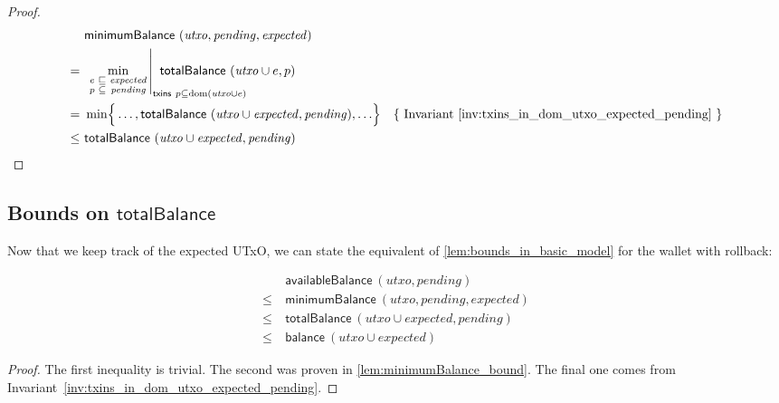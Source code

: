 \documentclass{article}
\DeclareMathOperator{\dom}{dom}
\DeclareMathOperator*{\minimum}{min}
\theoremstyle{definition}{
  \newtheorem{lemma}{Lemma}[section] %
  \newtheorem{definition}[lemma]{Definition}
}
\theoremstyle{theorem}{
  \newtheorem{invariant}[lemma]{Invariant}
  \newtheorem{proofobligation}[lemma]{Proof Obligation}
}
\numberwithin{equation}{lemma}
\begin{document}
\begin{proof}
\begin{align*}
    & ~ \mathsf{minimumBalance} ~ (\mathit{utxo}, \mathit{pending}, \mathit{expected}) \\
=   & ~ \left.
        \minimum_{\begin{smallmatrix}
                    e & \sqsubseteq & \mathit{expected} \\
                    p & \subseteq   & \mathit{pending}
                  \end{smallmatrix}}
        \right|_{\mathrlap{\mathsf{txins} ~ p \subseteq \dom(\mathit{utxo} \cup e)}}
        ~ \mathsf{totalBalance} ~ (\mathit{utxo} \cup e, p) \\
=   & ~ \minimum \Bigr\{ \ldots, \mathsf{totalBalance} ~ (\mathit{utxo} \cup \mathit{expected}, \mathit{pending}), \ldots \Bigr\}
    & \text{\{ Invariant~\ref{inv:txins_in_dom_utxo_expected_pending} \}} \\
\le & ~ \mathsf{totalBalance} ~ (\mathit{utxo} \cup \mathit{expected}, \mathit{pending})
\end{align*}
\end{proof}

\subsection{Bounds on $\mathsf{totalBalance}$}

Now that we keep track of the expected UTxO, we can state the equivalent
of \cref{lem:bounds_in_basic_model} for the wallet with rollback:

\begin{lemma}
\begin{align*}
    & ~ \mathsf{availableBalance} ~ (\mathit{utxo}, \mathit{pending}) \\
\le & ~ \mathsf{minimumBalance} ~ (\mathit{utxo}, \mathit{pending}, \mathit{expected}) \\
\le & ~ \mathsf{totalBalance} ~ (\mathit{utxo} \cup \mathit{expected}, \mathit{pending}) \\
\le & ~ \mathsf{balance} ~ (\mathit{utxo} \cup \mathit{expected})
\end{align*}
\label{lem:bounds_in_rollback_model}
\end{lemma}

\begin{proof}
The first inequality is trivial. The second was proven in
\cref{lem:minimumBalance_bound}. The final one comes from
Invariant~\ref{inv:txins_in_dom_utxo_expected_pending}.
\end{proof}
\end{document}
